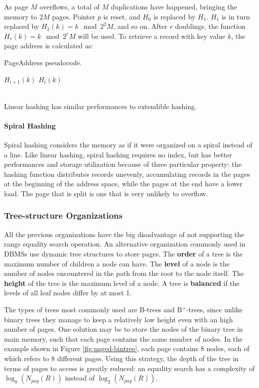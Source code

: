 As page $M$ overflows, a total of $M$ duplications have happened, bringing the memory to $2M$ pages. Pointer $p$ is reset, and $H_0$ is replaced by $H_1$. $H_1$ is in turn replaced by $H_2(k) = k \mod 2^2 M$, and so on. After $r$ doublings, the function $H_r(k) = k \mod 2^r M$ will be used. To retrieve a record with key value $k$, the page address is calculated as:
\begin{algorithm}
\caption{PageAddress pseudocode.}
\begin{algorithmic}[1]
        \State $H_{i+1}(k)$
    \Else  
        \State $H_i(k)$
    \EndIf
\end{algorithmic}
\end{algorithm}
\\Linear hashing has similar performances to extendible hashing.

\paragraph{Spiral Hashing}

Spiral hashing considers the memory as if it were organized on a spiral instead of a line. Like linear hashing, spiral hashing requires no index, but has better performances and storage utilization because of three particular property:
the hashing function distributes records unevenly, accumulating records in the pages at the beginning of the address space, while the pages at the end have a lower load. The page that is split is one that is very unlikely to overflow.

\subsubsection{Tree-structure Organizations}

All the previous organizations have the big disadvantage of not supporting the range equality search operation. An alternative organization commonly used in DBMSs use dynamic tree structures to store pages. The \textbf{order} of a tree is the maximum number of children a node can have. The \textbf{level} of a node is the number of nodes encountered in the path from the root to the node itself. The \textbf{height} of the tree is the maximum level of a node. A tree is \textbf{balanced} if the levels of all leaf nodes differ by at most 1.

The types of trees most commonly used are B-trees and B$^+$-trees, since unlike binary trees they manage to keep a relatively low height even with an high number of pages. One solution may be to store the nodes of the binary tree in main memory, such that each page contains the same number of nodes. In the example shown in Figure \ref{fig:paged-bintree}, each page contains 8 nodes, each of which refers to 8 different pages. Using this strategy, the depth of the tree in terms of pages to access is greatly reduced: an equality search has a complexity of $\log_8 (N_{pag}(R))$ instead of $\log_2 (N_{pag}(R))$.

